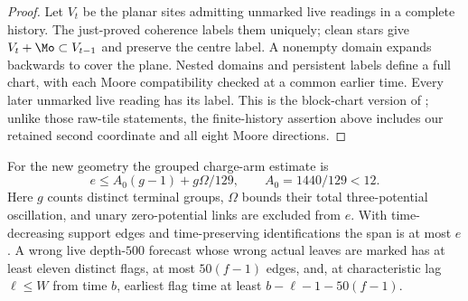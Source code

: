 \begin{proof}
Let $V_t$ be the planar sites admitting unmarked live readings in a complete history. The just-proved coherence labels them uniquely; clean stars give $V_t+\Mo\subset V_{t-1}$ and preserve the centre label. A nonempty domain expands backwards to cover the plane. Nested domains and persistent labels define a full chart, with each Moore compatibility checked at a common earlier time. Every later unmarked live reading has its label. This is the block-chart version of \cite[Lemmas~12.6--12.8]{DMforgetLower}; unlike those raw-tile statements, the finite-history assertion above includes our retained second coordinate and all eight Moore directions.
\end{proof}

\begin{lemma}\label{lem:lower-poles}
For the new geometry the grouped charge-arm estimate is
\[
 e\le A_0(g-1)+g\Omega/129,\qquad A_0=1440/129<12.
\]
Here $g$ counts distinct terminal groups, $\Omega$ bounds their total three-potential oscillation, and unary zero-potential links are excluded from $e$. With time-decreasing support edges and time-preserving identifications the span is at most $e$. A wrong live depth-$500$ forecast whose wrong actual leaves are marked has at least eleven distinct flags, at most $50(f-1)$ edges, and, at characteristic lag $\ell\le W$ from time $b$, earliest flag time at least $b-\ell-1-50(f-1)$.
\end{lemma}
